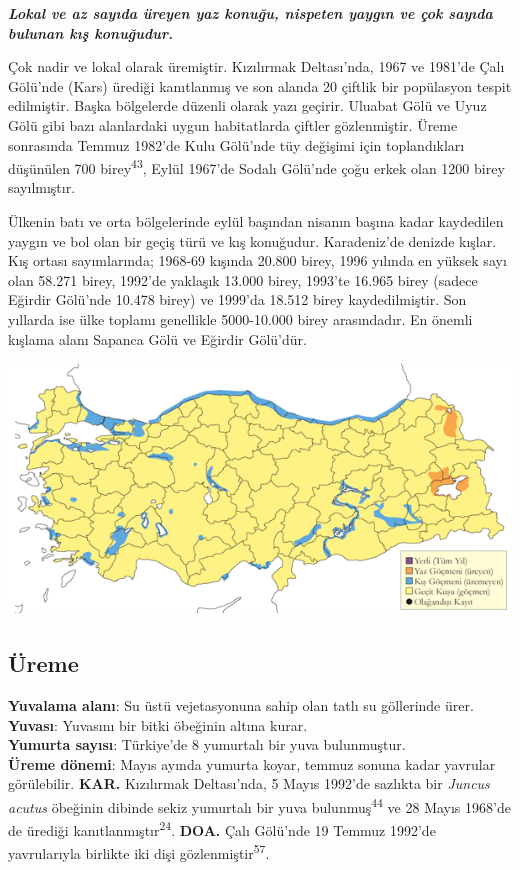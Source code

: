 \documentclass[
  letterpaper,
  DIV=11,
  numbers=noendperiod]{scrreprt}
\begin{document}
\textbf{\emph{Lokal ve az sayıda üreyen yaz konuğu, nispeten yaygın ve
çok sayıda bulunan kış konuğudur.}}

Çok nadir ve lokal olarak üremiştir. Kızılırmak Deltası'nda, 1967 ve
1981'de Çalı Gölü'nde (Kars) ürediği kanıtlanmış ve son alanda 20
çiftlik bir popülasyon tespit edilmiştir. Başka bölgelerde düzenli
olarak yazı geçirir. Uluabat Gölü ve Uyuz Gölü gibi bazı alanlardaki
uygun habitatlarda çiftler gözlenmiştir. Üreme sonrasında Temmuz 1982'de
Kulu Gölü'nde tüy değişimi için toplandıkları düşünülen 700
birey\textsuperscript{43}, Eylül 1967'de Sodalı Gölü'nde çoğu erkek olan
1200 birey sayılmıştır.

Ülkenin batı ve orta bölgelerinde eylül başından nisanın başına kadar
kaydedilen yaygın ve bol olan bir geçiş türü ve kış konuğudur.
Karadeniz'de denizde kışlar. Kış ortası sayımlarında; 1968-69 kışında
20.800 birey, 1996 yılında en yüksek sayı olan 58.271 birey, 1992'de
yaklaşık 13.000 birey, 1993'te 16.965 birey (sadece Eğirdir Gölü'nde
10.478 birey) ve 1999'da 18.512 birey kaydedilmiştir. Son yıllarda ise
ülke toplamı genellikle 5000-10.000 birey arasındadır. En önemli kışlama
alanı Sapanca Gölü ve Eğirdir Gölü'dür.

\includegraphics{images/harita_Page_025.png}

\hypertarget{uxfcreme-24}{%
\subsection{\texorpdfstring{\textbf{Üreme}}{Üreme}}\label{uxfcreme-24}}

\textbf{Yuvalama alanı}: Su üstü vejetasyonuna sahip olan tatlı su
göllerinde ürer.\\
\textbf{Yuvası}: Yuvasını bir bitki öbeğinin altına kurar.\\
\textbf{Yumurta sayısı}: Türkiye'de 8 yumurtalı bir yuva bulunmuştur.\\
\textbf{Üreme dönemi}: Mayıs ayında yumurta koyar, temmuz sonuna kadar
yavrular görülebilir. \textbf{KAR.} Kızılırmak Deltası'nda, 5 Mayıs
1992'de sazlıkta bir \emph{Juncus acutus} öbeğinin dibinde sekiz
yumurtalı bir yuva bulunmuş\textsuperscript{44} ve 28 Mayıs 1968'de de
ürediği kanıtlanmıştır\textsuperscript{24}. \textbf{DOA.} Çalı Gölü'nde
19 Temmuz 1992'de yavrularıyla birlikte iki dişi
gözlenmiştir\textsuperscript{57}.
\end{document}
